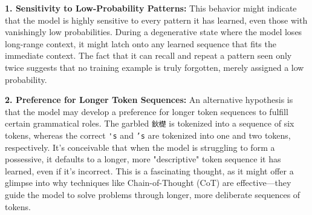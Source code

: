 \textbf{1. Sensitivity to Low-Probability Patterns:} This behavior might indicate that the model is highly sensitive to every pattern it has learned, even those with vanishingly low probabilities. During a degenerative state where the model loses long-range context, it might latch onto any learned sequence that fits the immediate context. The fact that it can recall and repeat a pattern seen only twice suggests that no training example is truly forgotten, merely assigned a low probability.

\textbf{2. Preference for Longer Token Sequences:} An alternative hypothesis is that the model may develop a preference for longer token sequences to fulfill certain grammatical roles. The garbled \lstinline{鈥檚} is tokenized into a sequence of six tokens, whereas the correct \lstinline{'s} and \lstinline{’s} are tokenized into one and two tokens, respectively. It's conceivable that when the model is struggling to form a possessive, it defaults to a longer, more "descriptive" token sequence it has learned, even if it's incorrect. This is a fascinating thought, as it might offer a glimpse into why techniques like Chain-of-Thought (CoT) are effective—they guide the model to solve problems through longer, more deliberate sequences of tokens.
